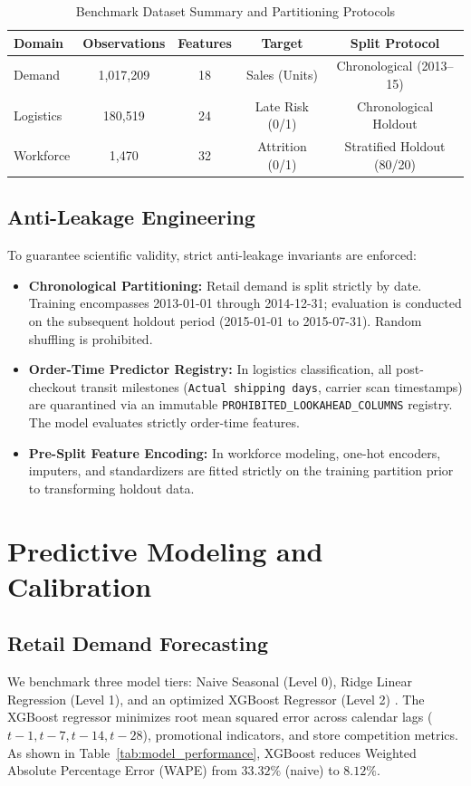 \documentclass[10pt,conference]{IEEEtran}
\begin{document}
\begin{table}[htbp]
\caption{Benchmark Dataset Summary and Partitioning Protocols}
\begin{center}
\begin{tabular}{lcccc}
\toprule
\textbf{Domain} & \textbf{Observations} & \textbf{Features} & \textbf{Target} & \textbf{Split Protocol} \\
\midrule
Demand & 1,017,209 & 18 & Sales (Units) & Chronological (2013--15) \\
Logistics & 180,519 & 24 & Late Risk (0/1) & Chronological Holdout \\
Workforce & 1,470 & 32 & Attrition (0/1) & Stratified Holdout (80/20) \\
\bottomrule
\end{tabular}
\label{tab:datasets}
\end{center}
\end{table}

\subsection{Anti-Leakage Engineering}
To guarantee scientific validity, strict anti-leakage invariants are enforced:
\begin{itemize}
    \item \textbf{Chronological Partitioning:} Retail demand is split strictly by date. Training encompasses 2013-01-01 through 2014-12-31; evaluation is conducted on the subsequent holdout period (2015-01-01 to 2015-07-31). Random shuffling is prohibited.
    \item \textbf{Order-Time Predictor Registry:} In logistics classification, all post-checkout transit milestones (\texttt{Actual shipping days}, carrier scan timestamps) are quarantined via an immutable \texttt{PROHIBITED\_LOOKAHEAD\_COLUMNS} registry. The model evaluates strictly order-time features.
    \item \textbf{Pre-Split Feature Encoding:} In workforce modeling, one-hot encoders, imputers, and standardizers are fitted strictly on the training partition prior to transforming holdout data.
\end{itemize}

\section{Predictive Modeling and Calibration}

\subsection{Retail Demand Forecasting}
We benchmark three model tiers: Naive Seasonal (Level 0), Ridge Linear Regression (Level 1), and an optimized XGBoost Regressor (Level 2) \cite{chen2016xgboost}. The XGBoost regressor minimizes root mean squared error across calendar lags ($t-1, t-7, t-14, t-28$), promotional indicators, and store competition metrics.
As shown in Table~\ref{tab:model_performance}, XGBoost reduces Weighted Absolute Percentage Error (WAPE) from $33.32\%$ (naive) to $8.12\%$.
\end{document}
